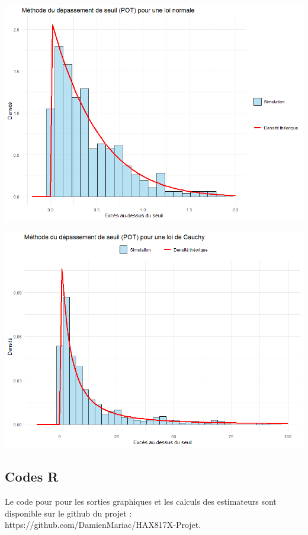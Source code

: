 \documentclass{article}
\theoremstyle{plain}
\theoremstyle{definition}
\theoremstyle{plain}
\begin{document}
\begin{center}
	\includegraphics[scale=0.60]{./images/DS_Normale} 
\end{center}

\begin{center}
	\includegraphics[scale=0.60]{./images/DS_Cauchy} 
\end{center}

\subsection{Codes R}

\noindent Le code pour pour les sorties graphiques et les calculs des estimateurs sont disponible sur le github du projet : https://github.com/DamienMariac/HAX817X-Projet.
\end{document}
